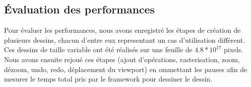 		\subsection{Évaluation des performances}
			Pour évaluer les performances, nous avons enregistré les étapes de création de plusieurs dessins, chacun d'entre eux representant
			un cas d'utilisation différent. Ces dessins de taille variable ont été réalisés sur une feuille de $4.8*10^17$ pixels. Nous avons 
			ensuite rejoué ces étapes (ajout d'opérations, rasterisation, zoom, dézoom, undo, redo,
			déplacement du viewport) en ommettant les pauses afin de mesurer le temps total pris par le framework pour dessiner le dessin.

			\begin{figure}[h]
				\centering
				\captionsetup[subfigure]{labelformat=empty}
				\\

\end{figure}
